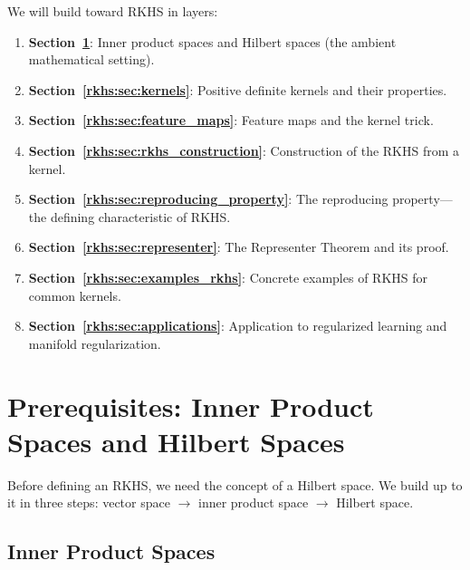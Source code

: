 \begin{notechapter}
\begin{insightbox}[Roadmap]
We will build toward RKHS in layers:
\begin{enumerate}
  \item \textbf{Section~\ref{rkhs:sec:prereq}}: Inner product spaces and
  Hilbert spaces (the ambient mathematical setting).
  \item \textbf{Section~\ref{rkhs:sec:kernels}}: Positive definite kernels
  and their properties.
  \item \textbf{Section~\ref{rkhs:sec:feature_maps}}: Feature maps and the
  kernel trick.
  \item \textbf{Section~\ref{rkhs:sec:rkhs_construction}}: Construction of
  the RKHS from a kernel.
  \item \textbf{Section~\ref{rkhs:sec:reproducing_property}}: The reproducing
  property---the defining characteristic of RKHS.
  \item \textbf{Section~\ref{rkhs:sec:representer}}: The Representer Theorem
  and its proof.
  \item \textbf{Section~\ref{rkhs:sec:examples_rkhs}}: Concrete examples of
  RKHS for common kernels.
  \item \textbf{Section~\ref{rkhs:sec:applications}}: Application to
  regularized learning and manifold regularization.
\end{enumerate}
\end{insightbox}


\section{Prerequisites: Inner Product Spaces and Hilbert Spaces}
\label{rkhs:sec:prereq}

Before defining an RKHS, we need the concept of a Hilbert space. We
build up to it in three steps: vector space $\to$ inner product space
$\to$ Hilbert space.

\subsection{Inner Product Spaces}
\label{rkhs:subsec:inner_product}


\end{notechapter}
